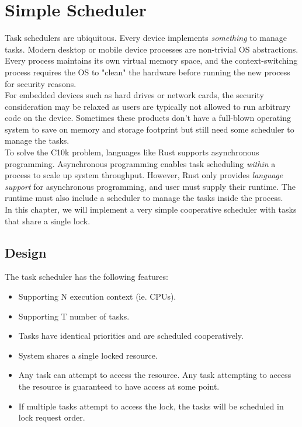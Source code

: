 % 

\chapter{Simple Scheduler}

Task schedulers are ubiquitous. Every device implements
\textit{something} to manage tasks. Modern desktop or mobile device processes
are non-trivial OS abstractions. Every process maintains its own virtual memory
space, and the context-switching process requires the OS to "clean" the hardware
before running the new process for security reasons.\\

For embedded devices such as hard drives or network cards, the security
consideration may be relaxed as users are typically not allowed to run arbitrary
code on the device. Sometimes these products don't have a full-blown operating
system to save on memory and storage footprint but still need some scheduler to manage the tasks.\\

To solve the C10k \cite{c10k} problem, languages like Rust supports asynchronous
programming. Asynchronous programming enables task scheduling \textit{within} a
process to scale up system throughput. However, Rust only provides
\textit{language support} for asynchronous programming, and user must supply
their runtime. The runtime must also include a scheduler to manage the
tasks inside the process.\\

In this chapter, we will implement a very simple cooperative scheduler with
tasks that share a single lock.

\section{Design}

The task scheduler has the following features:
\begin{itemize}
    \item Supporting N execution context (ie. CPUs).
    \item Supporting T number of tasks.
    \item Tasks have identical priorities and are scheduled cooperatively.
    \item System shares a single locked resource.
    \item Any task can attempt to access the resource. Any task attempting to
    access the resource is guaranteed to have access at some point.
    \item If multiple tasks attempt to access the lock, the tasks will be
    scheduled in lock request order. 
\end{itemize}

